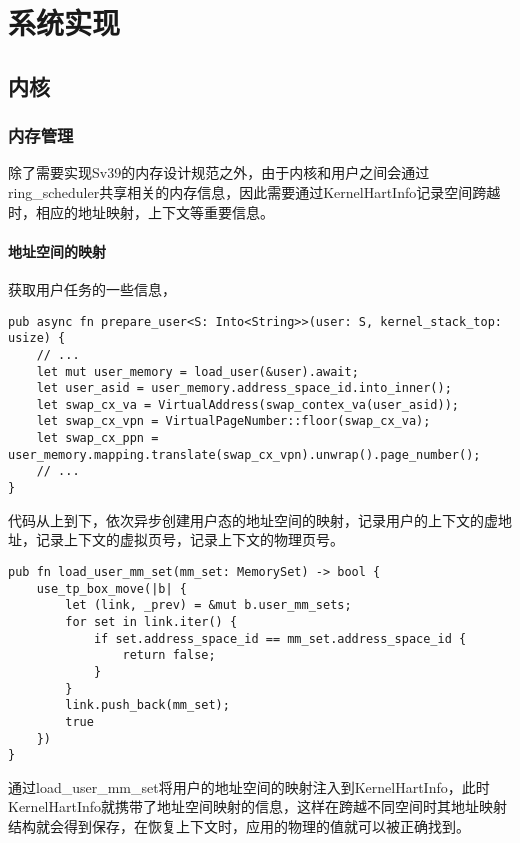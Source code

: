 \chapter{系统实现}
\label{chap:SystemImplement}

\section{内核}

\subsection{内存管理}

除了需要实现Sv39的内存设计规范之外，由于内核和用户之间会通过ring\_scheduler共享相关的内存信息，因此需要通过KernelHartInfo记录空间跨越时，相应的地址映射，上下文等重要信息。

\subsubsection{地址空间的映射}

获取用户任务的一些信息， 
\begin{lstlisting}[caption=用户任务信息获取]
pub async fn prepare_user<S: Into<String>>(user: S, kernel_stack_top: usize) {
    // ...
    let mut user_memory = load_user(&user).await;
    let user_asid = user_memory.address_space_id.into_inner();
    let swap_cx_va = VirtualAddress(swap_contex_va(user_asid));
    let swap_cx_vpn = VirtualPageNumber::floor(swap_cx_va);
    let swap_cx_ppn = user_memory.mapping.translate(swap_cx_vpn).unwrap().page_number();
    // ...
}
\end{lstlisting}

代码从上到下，依次异步创建用户态的地址空间的映射，记录用户的上下文的虚地址，记录上下文的虚拟页号，记录上下文的物理页号。

\begin{lstlisting}[caption=向KernelHartInfo注入地址空间信息]
pub fn load_user_mm_set(mm_set: MemorySet) -> bool {
    use_tp_box_move(|b| {
        let (link, _prev) = &mut b.user_mm_sets;
        for set in link.iter() {
            if set.address_space_id == mm_set.address_space_id {
                return false;
            }
        }
        link.push_back(mm_set);
        true
    })
}
\end{lstlisting}
通过load\_user\_mm\_set将用户的地址空间的映射注入到KernelHartInfo，此时KernelHartInfo就携带了地址空间映射的信息，这样在跨越不同空间时其地址映射结构就会得到保存，在恢复上下文时，应用的物理的值就可以被正确找到。


